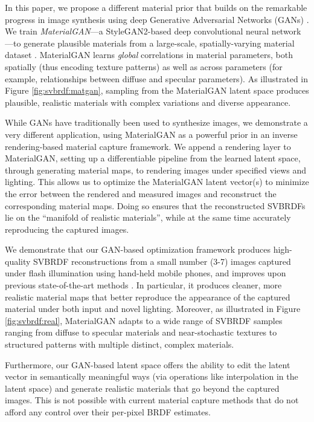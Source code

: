 In this paper, we propose a different material prior that builds on the remarkable progress in image synthesis using deep Generative Adversarial Networks (GANs) \cite{goodfellow2014generative,karras2018progressive,karras2019style}.
We train \emph{MaterialGAN}---a StyleGAN2-based deep convolutional neural network \cite{karras2020analyzing}---to generate plausible materials from a large-scale, spatially-varying material dataset \cite{deschaintre2018single}.
MaterialGAN learns \emph{global} correlations in material parameters, both spatially (thus encoding texture patterns) as well as across parameters (for example, relationships between diffuse and specular parameters).
As illustrated in Figure \ref{fig:svbrdf:matgan}, sampling from the MaterialGAN latent space produces plausible, realistic materials with complex variations and diverse appearance.



While GANs have traditionally been used to synthesize images, we demonstrate a very different application, using MaterialGAN as a powerful prior in an inverse rendering-based material capture framework.
We append a rendering layer to MaterialGAN, setting up a differentiable pipeline from the learned latent space, through generating material maps, to rendering images under specified views and lighting.
This allows us to optimize the MaterialGAN latent vector(s) to minimize the error between the rendered and measured images and reconstruct the corresponding material maps.
Doing so ensures that the reconstructed SVBRDFs lie on the ``manifold of realistic materials'', while at the same time accurately reproducing the captured images.

We demonstrate that our GAN-based optimization framework produces high-quality SVBRDF reconstructions from a small number (3-7) images captured under flash illumination using hand-held mobile phones, and improves upon previous state-of-the-art methods \cite{gao2019deep,deschaintre2019flexible}.
In particular, it produces cleaner, more realistic material maps that better reproduce the appearance of the captured material under both input and novel lighting.
Moreover, as illustrated in Figure \ref{fig:svbrdf:real}, MaterialGAN adapts to a wide range of SVBRDF samples ranging from diffuse to specular materials and near-stochastic textures to structured patterns with multiple distinct, complex materials.

Furthermore, our GAN-based latent space offers the ability to edit the latent vector in semantically meaningful ways (via operations like interpolation in the latent space) and generate realistic materials that go beyond the captured images.
This is not possible with current material capture methods that do not afford any control over their per-pixel BRDF estimates.


